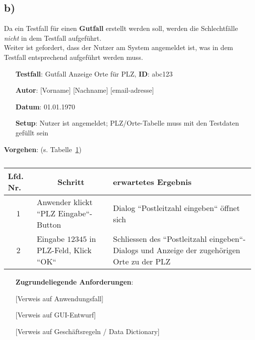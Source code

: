 \subsection*{b)}


Da ein Testfall für einen \textbf{Gutfall} erstellt werden soll, werden die Schlechtfälle \textit{nicht} in dem Testfall aufgeführt.\\
Weiter ist gefordert, dass der Nutzer am System angemeldet ist, was in dem Testfall entsprechend aufgeführt werden muss.


\begin{itemize}
    \item[] \textbf{Testfall}: Gutfall Anzeige Orte für PLZ, \textbf{ID}: abc123
    \item[] \textbf{Autor}: [Vorname] [Nachname] [email-adresse]
    \item[] \textbf{Datum}: 01.01.1970
    \item[] \textbf{Setup}: Nutzer ist angemeldet; PLZ/Orte-Tabelle muss mit den Testdaten gefüllt sein
\end{itemize}

\textbf{Vorgehen}: (s. Tabelle~\ref{tab:testfall})

\begin{table}[]
    \centering
    \setlength{\tabcolsep}{0.5em}
    \def\arraystretch{1.5}
    \begin{tabular}{|c|p{6cm}|p{6cm}|}
        \hline
        \multicolumn{1}{|l|}{\textbf{Lfd. Nr.}} & \multicolumn{1}{c|}{\textbf{Schritt}}        & \textbf{erwartetes Ergebnis}                        \\ \hline
        1 & Anwender klickt ``PLZ Eingabe``-Button & Dialog ``Postleitzahl eingeben`` öffnet sich\\ \hline
        2 & Eingabe $12345$ in PLZ-Feld, Klick ``OK`` & Schliessen des ``Postleitzahl eingeben``-Dialogs und Anzeige der zugehörigen Orte zu der PLZ\\ \hline
    \end{tabular}
    \caption[]{}
    \label{tab:testfall}
\end{table}

\noindent

\begin{itemize}
    \item[]  \textbf{Zugrundeliegende Anforderungen}:
    \item[] [Verweis auf Anwendungsfall]
    \item[] [Verweis auf GUI-Entwurf]
    \item[] [Verweis auf Geschäftsregeln / Data Dictionary]
\end{itemize}